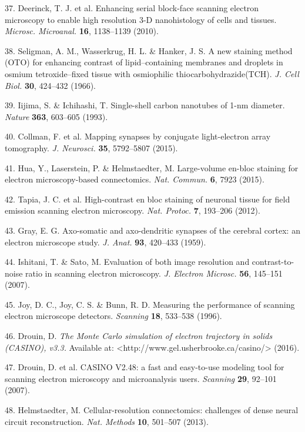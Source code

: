 \documentclass{article}
\begin{document}
\begin{hangpars}
37. Deerinck, T. J. et al. Enhancing serial block-face scanning electron microscopy to enable high resolution 3-D nanohistology of cells and tissues. \emph{Microsc. Microanal.} \textbf{16}, 1138–1139 (2010).

38. Seligman, A. M., Wasserkrug, H. L. \& Hanker, J. S. A new staining method (OTO) for enhancing contrast of lipid--containing membranes and droplets in osmium tetroxide--fixed tissue with osmiophilic thiocarbohydrazide(TCH). \emph{J. Cell Biol.} \textbf{30}, 424–432 (1966).

39. Iijima, S. \& Ichihashi, T. Single-shell carbon nanotubes of 1-nm diameter. \emph{Nature} \textbf{363}, 603–605 (1993).

40. Collman, F. et al. Mapping synapses by conjugate light-electron array tomography. \emph{J. Neurosci.} \textbf{35}, 5792–5807 (2015).

41. Hua, Y., Laserstein, P. \& Helmstaedter, M. Large-volume en-bloc staining for electron microscopy-based connectomics. \emph{Nat. Commun.} \textbf{6}, 7923 (2015).

42. Tapia, J. C. et al. High-contrast en bloc staining of neuronal tissue for field emission scanning electron microscopy. \emph{Nat. Protoc.} \textbf{7}, 193–206 (2012).

43. Gray, E. G. Axo-somatic and axo-dendritic synapses of the cerebral cortex: an electron microscope study. \emph{J. Anat.} \textbf{93}, 420–433 (1959).

44. Ishitani, T. \& Sato, M. Evaluation of both image resolution and contrast-to-noise ratio in scanning electron microscopy. \emph{J. Electron Microsc.} \textbf{56}, 145–151 (2007).

45. Joy, D. C., Joy, C. S. \& Bunn, R. D. Measuring the performance of scanning electron microscope detectors. \emph{Scanning} \textbf{18}, 533–538 (1996).

46. Drouin, D. \emph{The Monte Carlo simulation of electron trajectory in solids (CASINO), v3.3.} Available at: <http://www.gel.usherbrooke.ca/casino/> (2016).

47. Drouin, D. et al. CASINO V2.48: a fast and easy-to-use modeling tool for scanning electron microscopy and microanalysis users. \emph{Scanning} \textbf{29}, 92–101 (2007).

48. Helmstaedter, M. Cellular-resolution connectomics: challenges of dense neural circuit reconstruction. \emph{Nat. Methods} \textbf{10}, 501–507 (2013).


\end{hangpars}
\end{document}
